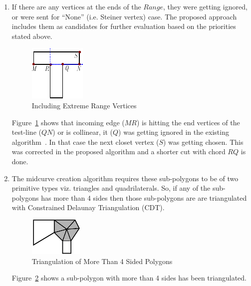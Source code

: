 \begin{enumerate}
[noitemsep,topsep=2pt,parsep=2pt,partopsep=2pt,leftmargin=*]

\item If there are any vertices at the ends of the $Range$, they were getting ignored, or were sent for ``None'' (i.e. Steiner vertex) case. The proposed approach includes them as candidates for further evaluation based on the priorities stated above.


\begin{figure}[h]
\centering \includegraphics[width=0.25\linewidth]{../Common/images/polydecomp_mine_1.pdf} 
\caption{Including Extreme Range Vertices}
\label{fig_mine}
\end{figure}



Figure~\ref{fig_mine} shows that incoming edge ($MR$) is hitting the end vertices of the test-line ($QN$) or is collinear, it ($Q$) was getting ignored in the existing algorithm~\cite{Bayazit}. In that case the next closet vertex ($S$) was getting chosen. This was corrected in the proposed algorithm and a shorter cut with chord $RQ$ is done.

\item The midcurve creation algorithm requires these sub-polygons to be of two primitive types viz. triangles and quadrilaterals. So, if any of the sub-polygons has more than 4 sides then those sub-polygons are are triangulated with Constrained Delaunay Triangulation (CDT).


\begin{figure}[h]
\centering \includegraphics[width=0.3\linewidth]{../Common/images/polydecomp_divide_all_2.pdf} 
\caption{Triangulation of More Than 4 Sided Polygons}
\label{fig_divideall}
\end{figure}


Figure~\ref{fig_divideall} shows a sub-polygon with more than 4 sides has been triangulated.

\end{enumerate}

